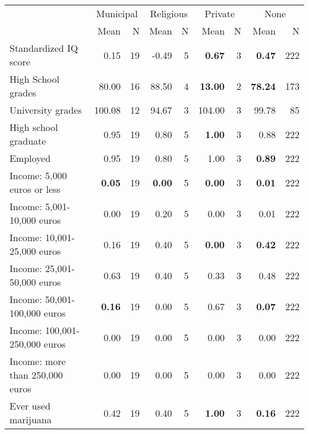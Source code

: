 \begin{tabular}{l r r r r r r r r}
\toprule
& \multicolumn{2}{c}{Municipal} & \multicolumn{2}{c}{Religious} & \multicolumn{2}{c}{Private} & \multicolumn{2}{c}{None} \\
& \scriptsize Mean & \scriptsize N & \scriptsize Mean & \scriptsize N & \scriptsize Mean & \scriptsize N & \scriptsize Mean & \scriptsize N \\
\midrule
Standardized IQ score &      0.15 &        19 &     -0.49 &         5 & \textbf{     0.67} &         3 & \textbf{     0.47} &       222 \\
High School grades &     80.00 &        16 &     88.50 &         4 & \textbf{    13.00} &         2 & \textbf{    78.24} &       173 \\
University grades &    100.08 &        12 &     94.67 &         3 &    104.00 &         3 &     99.78 &        85 \\
High school graduate &      0.95 &        19 &      0.80 &         5 & \textbf{     1.00} &         3 &      0.88 &       222 \\
Employed &      0.95 &        19 &      0.80 &         5 &      1.00 &         3 & \textbf{     0.89} &       222 \\
Income: 5,000 euros or less & \textbf{     0.05} &        19 & \textbf{     0.00} &         5 & \textbf{     0.00} &         3 & \textbf{     0.01} &       222 \\
Income: 5,001-10,000 euros &      0.00 &        19 &      0.20 &         5 &      0.00 &         3 &      0.01 &       222 \\
Income: 10,001-25,000 euros &      0.16 &        19 &      0.40 &         5 & \textbf{     0.00} &         3 & \textbf{     0.42} &       222 \\
Income: 25,001-50,000 euros &      0.63 &        19 &      0.40 &         5 &      0.33 &         3 &      0.48 &       222 \\
Income: 50,001-100,000 euros & \textbf{     0.16} &        19 &      0.00 &         5 &      0.67 &         3 & \textbf{     0.07} &       222 \\
Income: 100,001-250,000 euros &      0.00 &        19 &      0.00 &         5 &      0.00 &         3 &      0.00 &       222 \\
Income: more than 250,000 euros &      0.00 &        19 &      0.00 &         5 &      0.00 &         3 &      0.00 &       222 \\
Ever used marijuana &      0.42 &        19 &      0.40 &         5 & \textbf{     1.00} &         3 & \textbf{     0.16} &       222 \\

\end{tabular}
